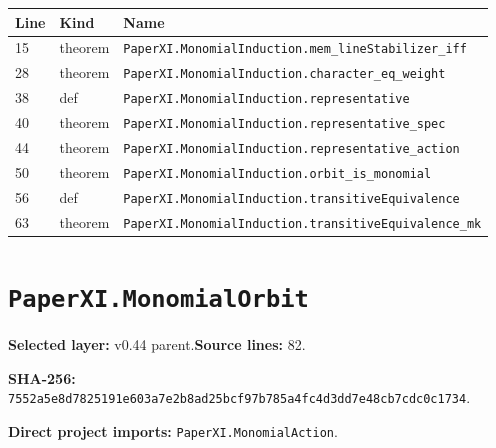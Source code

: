 \documentclass[10pt,oneside]{book}
\begin{document}
\begin{longtable}{@{}p{}p{}p{}@{}}\toprule Line&Kind&Name\\\midrule\endhead

15&theorem&\nolinkurl{PaperXI.MonomialInduction.mem_lineStabilizer_iff}\\

28&theorem&\nolinkurl{PaperXI.MonomialInduction.character_eq_weight}\\

38&def&\nolinkurl{PaperXI.MonomialInduction.representative}\\

40&theorem&\nolinkurl{PaperXI.MonomialInduction.representative_spec}\\

44&theorem&\nolinkurl{PaperXI.MonomialInduction.representative_action}\\

50&theorem&\nolinkurl{PaperXI.MonomialInduction.orbit_is_monomial}\\

56&def&\nolinkurl{PaperXI.MonomialInduction.transitiveEquivalence}\\

63&theorem&\nolinkurl{PaperXI.MonomialInduction.transitiveEquivalence_mk}\\

\bottomrule\end{longtable}

\section{\texorpdfstring{\nolinkurl{PaperXI.MonomialOrbit}}{PaperXI.MonomialOrbit}}\label{module:PaperXI.MonomialOrbit}

\textbf{Selected layer:} v0.44 parent.\quad\textbf{Source lines:} 82.\par\textbf{SHA-256:} {\scriptsize\nolinkurl{7552a5e8d7825191e603a7e2b8ad25bcf97b785a4fc4d3dd7e48cb7cdc0c1734}}.


\textbf{Direct project imports:} \nolinkurl{PaperXI.MonomialAction}.
\end{document}
